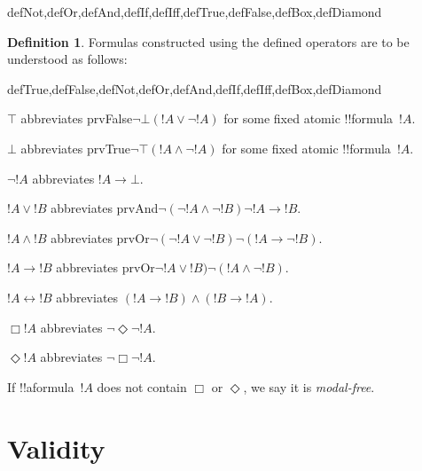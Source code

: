 \documentclass[10pt,a4paper]{article}
\theoremstyle{plain}
\theoremstyle{definition}
\newtheorem{defn}[thm]{Definition}
\theoremstyle{remark}
\newcommand*{\olfileid}[3]{}
\newcommand*{\olsection}[1]{\section*{#1}}
\providecommand{\lif}{\mathbin{\rightarrow}}
\providecommand{\ltrue}{\top}
\providecommand{\lfalse}{\bot}
\providecommand{\iftag}[1]{#1}
\providecommand{\tagitem}[1]{\item[#1]}
\providecommand{\liff}{\mathbin{\leftrightarrow}}
\begin{document}
\begin{tagblock}{defNot,defOr,defAnd,defIf,defIff,defTrue,defFalse,defBox,defDiamond}
\begin{defn}
Formulas constructed using the defined operators are to be understood
as follows:

\begin{tagenumerate}{defTrue,defFalse,defNot,defOr,defAnd,defIf,defIff,defBox,defDiamond}

\tagitem{defTrue}{$\ltrue$ abbreviates
  \iftag{prvFalse}{$\lnot\lfalse$}{$(!A \lor \lnot !A)$ for some
    fixed atomic !!{formula}~$!A$}.}{}

\tagitem{defFalse}{$\lfalse$ abbreviates
  \iftag{prvTrue}{$\lnot\ltrue$}{$(!A \land \lnot !A)$ for some
    fixed atomic !!{formula}~$!A$}.}{}

\tagitem{defNot}{$\lnot !A$ abbreviates $!A \lif \lfalse$.}{}

\tagitem{defOr}{$!A \lor !B$ abbreviates
  \iftag{prvAnd}{$\lnot(\lnot !A \land \lnot !B)$}{$\lnot !A \lif
    !B$}.}{}

\tagitem{defAnd}{$!A \land !B$ abbreviates
  \iftag{prvOr}{$\lnot(\lnot !A \lor \lnot !B)$}{$\lnot (!A \lif
    \lnot !B)$}.}{}

\tagitem{defIf}{$!A \lif !B$ abbreviates
  \iftag{prvOr}{$\lnot !A \lor !B)$}{$\lnot (!A \land \lnot !B)$}.}{}

\tagitem{defIff}{$!A \liff !B$ abbreviates $(!A \lif !B) \land (!B
  \lif !A)$.}{}

\tagitem{defBox}{$\Box !A$ abbreviates $\lnot\Diamond\lnot !A$. }{}

\tagitem{defDiamond}{$\Diamond !A$ abbreviates $\lnot\Box\lnot !A$.}{}
\end{tagenumerate}
\end{defn}
\end{tagblock}

If !!a{formula}~$!A$ does not contain $\Box$ or $\Diamond$, we say it
is \emph{modal-free}.





\olfileid{nml}{syn}{val}

\olsection{Validity}
\end{document}
